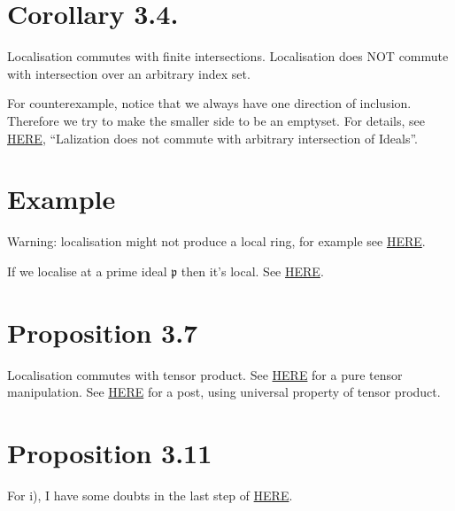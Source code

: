 \section{Corollary 3.4.}

Localisation commutes with finite intersections.
Localisation does NOT commute with intersection over an arbitrary index set. 

For counterexample, notice that we always have one direction of inclusion. Therefore we try to make the smaller side to be an emptyset. For details, see \href{https://math.stackexchange.com/questions/4057308/localization-does-not-commute-with-arbitrary-intersection-of-ideals}{HERE}, \enquote{Lalization does not commute with arbitrary intersection of Ideals}.

\section{Example}

Warning: localisation might not produce a local ring, for example see \href{https://math.stackexchange.com/questions/628371/a-f-is-not-a-local-ring}{HERE}.

If we localise at a prime ideal $\mathfrak p$ then it's local. See \href{https://math.stackexchange.com/questions/300446/why-is-the-localization-at-a-prime-ideal-a-local-ring#:~:text=Well%2C%20any%20proper%20ideal%20m,p%20is%20a%20local%20ring.}{HERE}.

\section{Proposition 3.7}

Localisation commutes with tensor product. See \href{http://sporadic.stanford.edu/math210a/sol4.pdf}{HERE} for a pure tensor manipulation. See \href{https://math.stackexchange.com/questions/2292960/localization-commutes-with-tensor-products}{HERE} for a post, using universal property of tensor product.

\section{Proposition 3.11}\label{Atiyah Chap 3 Prop 3.11.}

For i), I have some doubts in the last step of \href{https://math.stackexchange.com/questions/375353/every-ideal-of-the-localization-is-an-extended-ideal}{HERE}.

